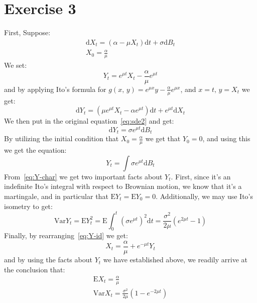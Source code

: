 \documentclass{amsart}
\theoremstyle{plain}
\theoremstyle{definition}
\theoremstyle{definition}
\theoremstyle{remark}
\newcommand{\diff}{\mathrm{d}}
\begin{document}
        \section{Exercise 3}
        First, Suppose:
        \begin{gather}
            \label{eq:sde2}
            \diff  X_{t} = \left(\alpha-\mu X_{t}\right)\diff t + \sigma \diff B_{t} \\
            X_{0} = \frac{\alpha}{\mu}
        \end{gather}
        We set:
        \begin{equation}
            \label{eq:Y-id}
            Y_{t} = e^{\mu t}X_{t} - \frac{\alpha}{\mu}e^{\mu t}
        \end{equation}
        and by applying Ito's formula for \(g \left(x,\,y\right) = e^{\mu x}y - \frac{\alpha}{\mu}e^{\mu x}\), and \(x=t,\,y=X_{t}\) we get:
        \begin{equation*}
            \diff Y_{t} = \left(\mu e^{\mu t}X_{t}-\alpha e^{\mu t}\right) \diff t + e^{\mu t}\diff X_{t}
        \end{equation*}
        We then put in the original equation~\eqref{eq:sde2} and get:
        \begin{equation*}
            \diff Y_{t} = \sigma e^{\mu t}\diff B_{t}
        \end{equation*}
        By utilizing the initial condition that \(X_{0} = \frac{\alpha}{\mu}\) we get that \(Y_{0} = 0\), and using this we get the equation:
        \begin{equation}
            \label{eq:Y-char}
            Y_{t} = \int \sigma e^{\mu t}\diff B_{t}
        \end{equation}
        From~\eqref{eq:Y-char} we get two important facts about \(Y_{t}\). First, since it's an indefinite Ito's integral with respect to Brownian motion, we know that it's a martingale, and in particular that \(\mathrm{E}Y_{t}=\mathrm{E}Y_{0}=0\). Additionally, we may use Ito's isometry to get:
        \begin{equation*}
            \mathrm{Var}Y_{t} = \mathrm{E}Y_{t}^{2} = \mathrm{E}\int_{0}^{t} \left(\sigma e^{\mu t}\right)^{2} \diff t = \frac{\sigma^{2}}{2 \mu} \left(e^{2 \mu t} - 1\right)
        \end{equation*}
       Finally, by rearranging~\eqref{eq:Y-id} we get:
       \begin{equation*}
           X_{t} = \frac{\alpha}{\mu} + e^{-\mu t}Y_{t}
       \end{equation*}
       and by using the facts about \(Y_{t}\) we have established above, we readily arrive at the conclusion that:
       \begin{gather*}
           \mathrm{E}X_{t} = \frac{\alpha}{\mu} \\
           \mathrm{Var} X_{t} = \frac{\sigma^{2}}{2 \mu} \left(1 - e^{-2 \mu t}\right)
       \end{gather*}
       
\end{document}

